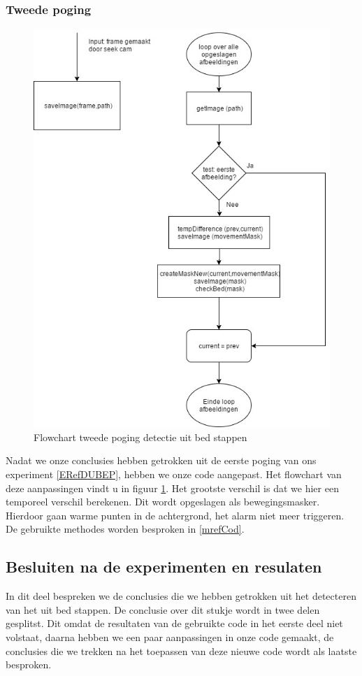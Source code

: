 \subsubsection{Tweede poging}
\label{ERefDUBTP}
\begin{figure}[hbp]
	\includegraphics[scale=0.45]{FlowChart_DetectUitBed_TweedePoging}
	\caption{Flowchart tweede poging detectie uit bed stappen}
	\label{imgFCDUBTP}
\end{figure}
Nadat we onze conclusies hebben getrokken uit de eerste poging van ons experiment \ref{ERefDUBEP}, hebben we onze code aangepast. Het flowchart van deze aanpassingen vindt u in figuur \ref{imgFCDUBTP}. Het grootste verschil is dat we hier een temporeel verschil berekenen. Dit wordt opgeslagen als bewegingsmasker. Hierdoor gaan warme punten in de achtergrond, het alarm niet meer triggeren. De gebruikte methodes worden besproken in \ref{mrefCod}.

\subsection{Besluiten na de experimenten en resulaten}
\label{ERefDBB}
In dit deel bespreken we de conclusies die we hebben getrokken uit het detecteren van het uit bed stappen. De conclusie over dit stukje wordt in twee delen gesplitst. Dit omdat de resultaten van de gebruikte code in het eerste deel niet volstaat, daarna hebben we een paar aanpassingen in onze code gemaakt, de conclusies die we trekken na het toepassen van deze nieuwe code wordt als laatste besproken.

